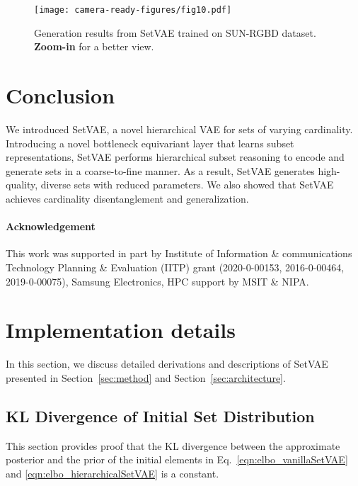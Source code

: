 \documentclass[final]{arxiv/cvpr}
\newcommand{\cutparagraphup}{\vspace*{-0.1in}}
\begin{document}
\begin{figure}[!t]
    \centering
    \texttt{[image: camera-ready-figures/fig10.pdf]}
    \vspace{-0.25in}
    \caption{Generation results from SetVAE trained on SUN-RGBD dataset. \textbf{Zoom-in} for a better view.}
\label{fig:sunrgbd}
\vspace{-0.15in}
\end{figure}
 \vspace*{-0.1in}
\section{Conclusion}
\label{sec:conclusion}
\vspace*{-0.05in}
We introduced SetVAE, a novel hierarchical VAE for sets of varying cardinality.
Introducing a novel bottleneck equivariant layer that learns subset representations, SetVAE performs hierarchical subset reasoning to encode and generate sets in a coarse-to-fine manner.
As a result, SetVAE generates high-quality, diverse sets with reduced parameters.
We also showed that SetVAE achieves cardinality disentanglement and generalization.
 \cutparagraphup
\paragraph{Acknowledgement} 
This work was supported in part by Institute of Information \& communications Technology Planning \&  Evaluation (IITP) grant (2020-0-00153, 2016-0-00464, 2019-0-00075), Samsung Electronics, HPC support by MSIT \& NIPA.
{\small


}
\clearpage
\clearpage
\appendix


\section{Implementation details}
In this section, we discuss detailed derivations and descriptions of SetVAE presented in Section~\ref{sec:method} and Section~\ref{sec:architecture}.

\subsection{KL Divergence of Initial Set Distribution}
\label{appendix:initial_kl}
This section provides proof that the KL divergence between the approximate posterior and the prior of the initial elements in Eq.~\eqref{eqn:elbo_vanillaSetVAE} and \eqref{eqn:elbo_hierarchicalSetVAE} is a constant.
\end{document}
